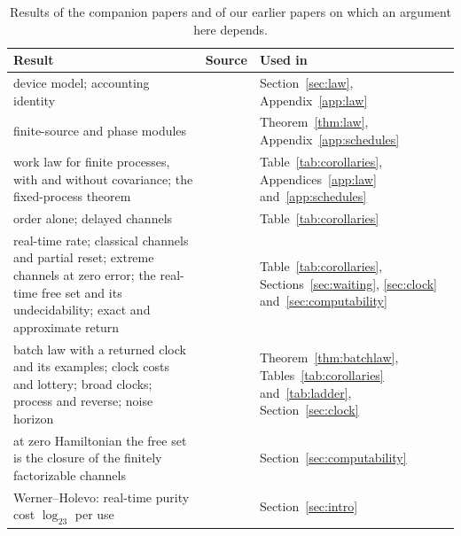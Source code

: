\documentclass[11pt]{article}
\theoremstyle{definition}
\theoremstyle{remark}
\begin{document}
\begin{table}[tbp]
\centering\small
\begin{tabular}{@{}>{\raggedright\arraybackslash}p{}>{\raggedright\arraybackslash}p{}>{\raggedright\arraybackslash}p{}@{}}
\toprule
Result & Source & Used in\\
\midrule
device model; accounting identity & \cite[Sec.~2, Lemma~4]{SaveWork} & Section~\ref{sec:law}, Appendix~\ref{app:law}\\
finite-source and phase modules & \cite[Lemma~12, App.~E]{Answering} & Theorem~\ref{thm:law}, Appendix~\ref{app:schedules}\\
work law for finite processes, with and without covariance; the fixed-process theorem & \cite[Thms.~1, 9, 11]{Answering} & Table~\ref{tab:corollaries}, Appendices~\ref{app:law} and~\ref{app:schedules}\\
order alone; delayed channels & \cite[Prop.~3, Sec.~7]{Answering} & Table~\ref{tab:corollaries}\\
real-time rate; classical channels and partial reset; extreme channels at zero error; the real-time free set and its undecidability; exact and approximate return & \cite[Thms.~1, 2, 9, 11, 13; Props.~8, 10]{SaveWork} & Table~\ref{tab:corollaries}, Sections~\ref{sec:waiting}, \ref{sec:clock} and~\ref{sec:computability}\\
batch law with a returned clock and its examples; clock costs and lottery; broad clocks; process and reverse; noise horizon & \cite[Thms.~7, 10; Props.~2, 3, 8, 12, 14, 16]{KeepingTime} & Theorem~\ref{thm:batchlaw}, Tables~\ref{tab:corollaries} and~\ref{tab:ladder}, Section~\ref{sec:clock}\\
at zero Hamiltonian the free set is the closure of the finitely factorizable channels & \cite[Thm.~3.2(a)]{Memory} & Section~\ref{sec:computability}\\
Werner--Holevo: real-time purity cost $\log_23$ per use & \cite[Thm.~3.1]{ImmediateDelivery} & Section~\ref{sec:intro}\\
\bottomrule
\end{tabular}
\caption{Results of the companion papers and of our earlier papers on which an argument here depends.}\label{tab:companions}
\end{table}

\FloatBarrier


\end{document}
